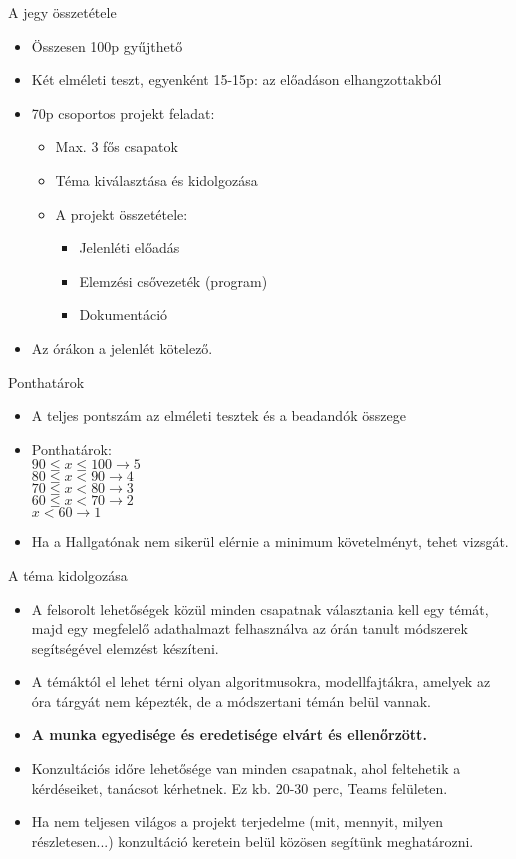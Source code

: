 \documentclass[english, aspectratio=169]{beamer}
\begin{document}
\begin{frame}{A jegy összetétele}
\begin{itemize}
	\item Összesen 100p gyűjthető
	\item Két elméleti teszt, egyenként 15-15p: az előadáson elhangzottakból
	\item 70p csoportos projekt feladat:
	\begin{itemize}
		\item Max. 3 fős csapatok
		\item Téma kiválasztása és kidolgozása
		\item A projekt összetétele:
		\begin{itemize}
			\item Jelenléti előadás
			\item Elemzési csővezeték (program)
			\item Dokumentáció
		\end{itemize}
	\end{itemize}
	\item Az órákon a jelenlét kötelező. 
\end{itemize}
\end{frame}

\begin{frame}{Ponthatárok}
\begin{itemize}
	\item A teljes pontszám az elméleti tesztek és a beadandók összege
	\item Ponthatárok:\\
	$90 \leq x \leq 100 \rightarrow 5$\\
	$80 \leq x < 90 \rightarrow 4$\\
	$70 \leq x < 80 \rightarrow 3$\\
	$60 \leq x < 70 \rightarrow 2$\\
	$x < 60 \rightarrow 1$
	\item Ha a Hallgatónak nem sikerül elérnie a minimum követelményt, tehet vizsgát.
\end{itemize}
\end{frame}

\begin{frame}{A téma kidolgozása}
\begin{itemize}
	\item A felsorolt lehetőségek közül minden csapatnak választania kell egy témát, majd egy megfelelő adathalmazt felhasználva az órán tanult módszerek segítségével elemzést készíteni. 
	\item A témáktól el lehet térni olyan algoritmusokra, modellfajtákra, amelyek az óra tárgyát nem képezték, de a módszertani témán belül vannak. 
	\item \textbf{A munka egyedisége és eredetisége elvárt és ellenőrzött.}
	\item Konzultációs időre lehetősége van minden csapatnak, ahol feltehetik a kérdéseiket, tanácsot kérhetnek. Ez kb. 20-30 perc, Teams felületen.
	\item Ha nem teljesen világos a projekt terjedelme (mit, mennyit, milyen részletesen...) konzultáció keretein belül közösen segítünk meghatározni.
\end{itemize}
\end{frame}
\end{document}
